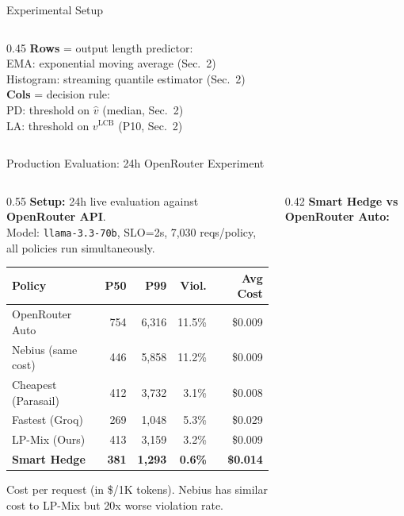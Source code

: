 \documentclass[aspectratio=169,10pt]{beamer}
\begin{document}
\begin{frame}{Experimental Setup}
\begin{columns}[T]
\begin{column}{0.45\textwidth}
\vspace{0.1cm}
\scriptsize
\textbf{Rows} = output length predictor:\\
\quad EMA: exponential moving average (Sec.~2)\\
\quad Histogram: streaming quantile estimator (Sec.~2)\\
\textbf{Cols} = decision rule:\\
\quad PD: threshold on $\hat{v}$ (median, Sec.~2)\\
\quad LA: threshold on $v^{\text{LCB}}$ (P10, Sec.~2)
\end{column}
\end{columns}
\end{frame}

\begin{frame}{Production Evaluation: 24h OpenRouter Experiment}
\vspace{-0.2cm}
\begin{columns}[T]
\begin{column}{0.55\textwidth}
\textbf{Setup:} 24h live evaluation against \textbf{OpenRouter API}.\\
\scriptsize Model: \texttt{llama-3.3-70b}, SLO=2s, 7,030 reqs/policy, all policies run simultaneously.

\vspace{0.2cm}
\footnotesize
\begin{tabular}{@{}lrrrr@{}}
\toprule
Policy & P50 & P99 & Viol. & Avg Cost \\
\midrule
OpenRouter Auto & 754 & 6,316 & 11.5\% & \$0.009 \\
Nebius (same cost) & 446 & 5,858 & 11.2\% & \$0.009 \\
Cheapest (Parasail) & 412 & 3,732 & 3.1\% & \$0.008 \\
Fastest (Groq) & 269 & 1,048 & 5.3\% & \$0.029 \\
LP-Mix (Ours) & 413 & 3,159 & 3.2\% & \$0.009 \\
\textbf{Smart Hedge} & \textbf{381} & \textbf{1,293} & \textbf{0.6\%} & \textbf{\$0.014} \\
\bottomrule
\end{tabular}

\vspace{0.1cm}
\scriptsize Cost per request (in \$/1K tokens). Nebius has similar cost to LP-Mix but 20x worse violation rate.
\end{column}

\begin{column}{0.42\textwidth}
\textbf{Smart Hedge vs OpenRouter Auto:}


\end{column}
\end{columns}
\end{frame}
\end{document}
